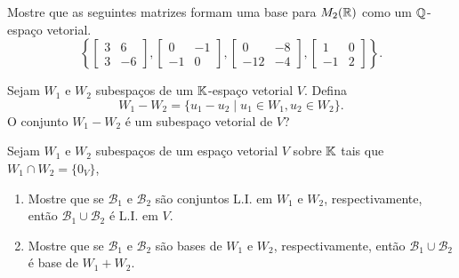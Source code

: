 \documentclass[12pt]{exam}
\begin{document}
    \begin{exercicio}
        Mostre que as seguintes matrizes formam uma base para $M_2(\mathbb{R})$ como um $\mathbb{Q}$-espaço vetorial.
        \[
            \left\{
                \begin{bmatrix}
                    3 & 6\\
                    3 & -6
                \end{bmatrix},
                \begin{bmatrix}
                    0 & -1\\
                    -1 & 0
                \end{bmatrix},
                \begin{bmatrix}
                    0 & -8\\
                    -12 & -4
                \end{bmatrix},
                \begin{bmatrix}
                    1 & 0\\
                    -1 & 2
                \end{bmatrix}
            \right\}.
        \]
    \end{exercicio}

    \begin{exercicio}
        Sejam $W_1$ e $W_2$  subespa\c{c}os de um $\mathbb{K}$-espa\c{c}o vetorial $V$. Defina
        \[
            W_1 - W_2 = \{ u_1 - u_2 \mid u_1 \in W_1, u_2 \in W_2\}.
        \]
        O conjunto $W_1 - W_2$ \'e um subespa\c{c}o vetorial de $V$?
    \end{exercicio}

    \begin{exercicio}
        Sejam $W_1$ e $W_2$ subespa\c{c}os de um espa\c{c}o vetorial $V$ sobre $\mathbb{K}$ tais que $W_1 \cap W_2 = \{0_V\}$,
        \begin{enumerate}[label={\alph*})]
            \item Mostre que se $\mathcal{B}_1$ e $\mathcal{B}_2$ s\~ao conjuntos L.I. em $W_1$ e $W_2$, respectivamente, ent\~ao $\mathcal{B}_1 \cup \mathcal{B}_2$ \'e L.I. em $V$.

            \item Mostre que se $\mathcal{B}_1$ e $\mathcal{B}_2$ s\~ao bases de $W_1$ e $W_2$, respectivamente, ent\~ao $\mathcal{B}_1 \cup \mathcal{B}_2$ \'e base de $W_1 + W_2$.
        \end{enumerate}
    \end{exercicio}
\end{document}
